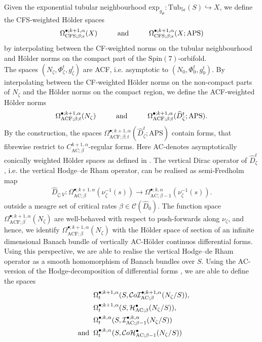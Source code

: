 \documentclass[psamsfonts]{amsart}
\theoremstyle{plain}
\theoremstyle{definition}{
\newtheorem{defi}{Definition}[section]
\newtheorem{ass}{Assumption}
\newtheorem*{nota}{Notation}}
\theoremstyle{remark}{
\newtheorem{rem}{Remark}
\newtheorem{ex}{Example}}
\theoremstyle{plain}{
\newtheorem{thm}{Theorem}[section]
\newtheorem{lem}{Lemma}[section]
\newtheorem{cor}{Corollary}[section]
\newtheorem{prop}{Proposition}[section]
\newtheorem{con}{Conjecture}[section]}
\newcommand{\m}[1]{{\mathrm{#1}}}
\newcommand{\und}[1]{\hspace{#1}\text{and}\hspace{#1}}
\begin{document}
Given the exponential tubular neighbourhood $\m{exp}_{g_\Phi} \colon\m{Tub}_{5\epsilon}(S)\hookrightarrow X$, we define the CFS-weighted Hölder spaces 
\begin{align*}
    \Omega^{\bullet;k+1,\alpha}_{\m{CFS};\beta;\epsilon}(X)\und{1.0cm}\Omega^{\bullet;k+1,\alpha}_{\m{CFS};\beta;\epsilon}(X;\m{APS})
\end{align*}
by interpolating between the CF-weighted norms on the tubular neighbourhood and  Hölder norms on the compact part of the $\m{Spin}(7)$-orbifold.\\

The spaces $(N_\zeta,\Phi^t_\zeta,g^t_\zeta)$ are ACF, i.e. asymptotic to $(N_0,\Phi^t_0,g^t_0)$. By interpolating between the CF-weighted Hölder norms on the non-compact parts of $N_\zeta$ and the  Hölder norms on the compact region, we define the ACF-weighted Hölder norms
\begin{align*}
    \Omega^{\bullet;k+1,\alpha}_{\m{ACF};\beta;t}(N_\zeta)\und{1.0cm}\Omega^{\bullet;k+1,\alpha}_{\m{ACF};\beta;t}(\widehat{D}^t_\zeta;\m{APS}).
\end{align*}
By the construction, the spaces $\Omega^{\bullet;k+1,\alpha}_{\m{ACF};\beta;t}(\widehat{D}^t_\zeta;\m{APS})$ contain forms, that fibrewise restrict to $C^{k+1,\alpha}_{\m{AC};\beta}$-regular forms. Here AC-denotes asymptotically conically weighted Hölder spaces as defined in \cite{lockhart1985elliptic}. The vertical Dirac operator of $\widehat{D}^t_\zeta$, i.e. the vertical Hodge--de Rham operator, can be realised as semi-Fredholm map
\begin{align*}
    \widehat{D}_{\zeta;V} \colon\Omega^{\bullet;k+1,\alpha}_{\m{AC};\beta}(\nu_\zeta^{-1}(s))\rightarrow \Omega^{\bullet;k,\alpha}_{\m{AC};\beta-1}(\nu_\zeta^{-1}(s)).
\end{align*}
outside a meagre set of critical rates $\beta\in\mathcal{C}(\widehat{D}_0)$. The function space $\Omega^{\bullet;k+1,\alpha}_{\m{ACF};\beta}(N_\zeta)$ are well-behaved with respect to push-forwards along $\nu_\zeta$, and hence, we identify $\Omega^{\bullet;k+1,\alpha}_{\m{ACF};\beta}(N_\zeta)$ with the Hölder space of section of an infinite dimensional Banach bundle of vertically AC-Hölder continuos differential forms. Using this perspective, we are able to realise the vertical Hodge--de Rham operator as a smooth homomorphism of Banach bundles over $S$. Using the AC-version of the Hodge-decomposition of differential forms \cite{lockhart1987fredholm}, we are able to define the spaces 
\begin{align*}
    &\Omega^{\bullet;k+1,\alpha}_{t}(S,\mathcal{C}o\mathcal{I}^{\bullet;k+1,\alpha}_{\m{AC};\beta}(N_\zeta/S)),\\
    &\Omega^{\bullet;k+1,\alpha}_{t}(S,\mathcal{H}^{\bullet}_{\m{AC};\beta}(N_\zeta/S)),\\
    &\Omega^{\bullet;k,\alpha}_{t}(S,\mathcal{I}^{\bullet;k,\alpha}_{\m{AC};\beta-1}(N_\zeta/S))\\
    \und{0.2cm}&\Omega^{\bullet;k,\alpha}_{t}(S,\mathcal{C}o\mathcal{H}^{\bullet}_{\m{AC};\beta-1}(N_\zeta/S))
\end{align*}
\end{document}
